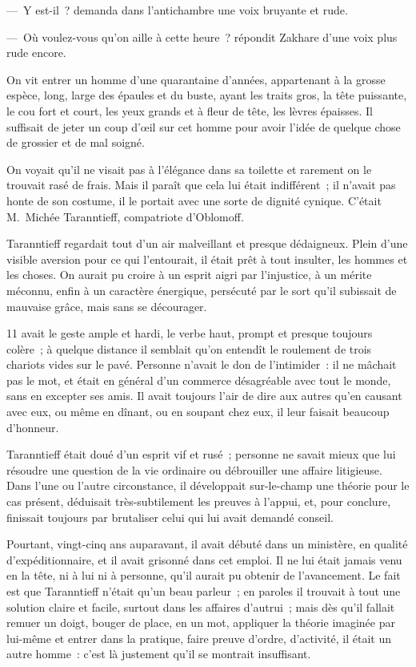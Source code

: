 \documentclass[french,twoside]{book} %
\begin{document}
\noindent — Y est-il ? demanda dans l’antichambre une voix bruyante et rude.\par
— Où voulez-vous qu’on aille à cette heure ? répondit Zakhare d’une voix plus rude encore.\par
On vit entrer un homme d’une quarantaine d’années, appartenant à la grosse espèce, long, large des épaules et du buste, ayant les traits gros, la tête puissante, le cou fort et court, les yeux grands et à fleur de tête, les lèvres épaisses. Il suffisait de jeter un coup d’œil sur cet homme pour avoir l’idée de quelque chose de grossier et de mal soigné.\par
On voyait qu’il ne visait pas à l’élégance dans sa toilette et rarement on le trouvait rasé de frais. Mais il paraît que cela lui était indifférent ; il n’avait pas honte de son costume, il le portait avec une sorte de dignité cynique. C’était M. Michée Taranntieff, compatriote d’Oblomoff.\par
Taranntieff regardait tout d’un air malveillant et presque dédaigneux. Plein d’une visible aversion pour ce qui l’entourait, il était prêt à tout insulter, les hommes et les choses. On aurait pu croire à un esprit aigri par l’injustice, à un mérite méconnu, enfin à un caractère énergique, persécuté par le sort qu’il subissait de mauvaise grâce, mais sans se décourager.\par
11 avait le geste ample et hardi, le verbe haut, prompt et presque toujours colère ; à quelque distance il semblait qu’on entendît le roulement de trois chariots vides sur le pavé. Personne n’avait le don de l’intimider : il ne mâchait pas le mot, et était en général d’un commerce désagréable avec tout le monde, sans en excepter ses amis. Il avait toujours l’air de dire aux autres qu’en causant avec eux, ou même en dînant, ou en soupant chez eux, il leur faisait beaucoup d’honneur.\par
Taranntieff était doué d’un esprit vif et rusé ; personne ne savait mieux que lui résoudre une question de la vie ordinaire ou débrouiller une affaire litigieuse. Dans l’une ou l’autre circonstance, il développait sur-le-champ une théorie pour le cas présent, déduisait très-subtilement les preuves à l’appui, et, pour conclure, finissait toujours par brutaliser celui qui lui avait demandé conseil.\par
Pourtant, vingt-cinq ans auparavant, il avait débuté dans un ministère, en qualité d’expéditionnaire, et il avait grisonné dans cet emploi. Il ne lui était jamais venu en la tête, ni à lui ni à personne, qu’il aurait pu obtenir de l’avancement. Le fait est que Taranntieff n’était qu’un beau parleur ; en paroles il trouvait à tout une solution claire et facile, surtout dans les affaires d’autrui ; mais dès qu’il fallait remuer un doigt, bouger de place, en un mot, appliquer la théorie imaginée par lui-même et entrer dans la pratique, faire preuve d’ordre, d’activité, il était un autre homme : c’est là justement qu’il se montrait insuffisant.\par
\end{document}
